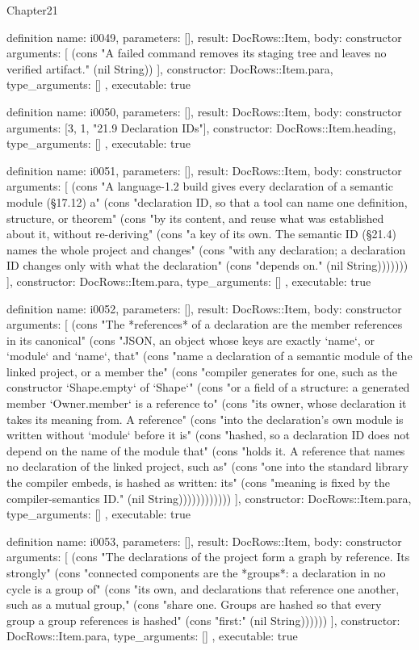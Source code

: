 \begin{lexlean}{Chapter21}
\begin{semanticmodule}
definition{
  name: i0049,
  parameters: [],
  result: DocRows::Item,
  body: constructor{
    arguments: [
      (cons "A failed command removes its staging tree and leaves no verified artifact." (nil String))
    ],
    constructor: DocRows::Item.para,
    type_arguments: []
  },
  executable: true
}

definition{
  name: i0050,
  parameters: [],
  result: DocRows::Item,
  body: constructor{
    arguments: [3, 1, "21.9 Declaration IDs"],
    constructor: DocRows::Item.heading,
    type_arguments: []
  },
  executable: true
}

definition{
  name: i0051,
  parameters: [],
  result: DocRows::Item,
  body: constructor{
    arguments: [
      (cons "A language-1.2 build gives every declaration of a semantic module (§17.12) a" (cons "declaration ID, so that a tool can name one definition, structure, or theorem" (cons "by its content, and reuse what was established about it, without re-deriving" (cons "a key of its own. The semantic ID (§21.4) names the whole project and changes" (cons "with any declaration; a declaration ID changes only with what the declaration" (cons "depends on." (nil String)))))))
    ],
    constructor: DocRows::Item.para,
    type_arguments: []
  },
  executable: true
}

definition{
  name: i0052,
  parameters: [],
  result: DocRows::Item,
  body: constructor{
    arguments: [
      (cons "The *references* of a declaration are the member references in its canonical" (cons "JSON, an object whose keys are exactly `name`, or `module` and `name`, that" (cons "name a declaration of a semantic module of the linked project, or a member the" (cons "compiler generates for one, such as the constructor `Shape.empty` of `Shape`" (cons "or a field of a structure: a generated member `Owner.member` is a reference to" (cons "its owner, whose declaration it takes its meaning from. A reference" (cons "into the declaration's own module is written without `module` before it is" (cons "hashed, so a declaration ID does not depend on the name of the module that" (cons "holds it. A reference that names no declaration of the linked project, such as" (cons "one into the standard library the compiler embeds, is hashed as written: its" (cons "meaning is fixed by the compiler-semantics ID." (nil String))))))))))))
    ],
    constructor: DocRows::Item.para,
    type_arguments: []
  },
  executable: true
}

definition{
  name: i0053,
  parameters: [],
  result: DocRows::Item,
  body: constructor{
    arguments: [
      (cons "The declarations of the project form a graph by reference. Its strongly" (cons "connected components are the *groups*: a declaration in no cycle is a group of" (cons "its own, and declarations that reference one another, such as a mutual group," (cons "share one. Groups are hashed so that every group a group references is hashed" (cons "first:" (nil String))))))
    ],
    constructor: DocRows::Item.para,
    type_arguments: []
  },
  executable: true
}


\end{semanticmodule}
\end{lexlean}
